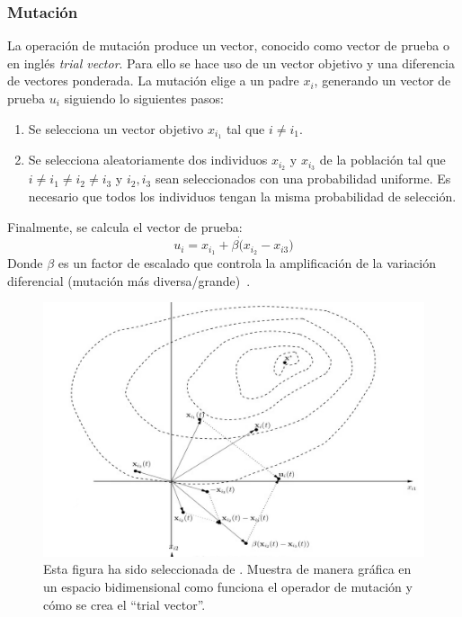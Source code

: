 \subsubsection{Mutación}
La operación de mutación produce un vector, conocido como vector de prueba o en inglés \textit{trial vector}. Para ello se hace uso de un vector objetivo y una diferencia de vectores ponderada. La mutación elige a un padre $x_{i}$, generando un vector de prueba $u_{i}$ siguiendo lo siguientes pasos:
\begin{enumerate}
    \item Se selecciona un vector objetivo $x_{i_1}$ tal que $i\neq i_1$.
    \item Se selecciona aleatoriamente dos individuos $x_{i_2}$ y $x_{i_3}$ de la población tal que $i\neq i_1\neq i_2\neq i_3$ y $i_2,i_3$ sean seleccionados con una probabilidad uniforme. Es necesario que todos los individuos tengan la misma probabilidad de selección.
\end{enumerate}
Finalmente, se calcula el vector de prueba:
\begin{equation}
    u_i = x_{i_1}+\beta\dot(x_{i_2}-x_{i3})
\end{equation}
Donde $\beta$ es un factor de escalado que controla la amplificación de la variación diferencial (mutación más diversa/grande)~\cite{storn_differential_1997}.

\begin{figure}[htp]
    \begin{center}
        \includegraphics[width=1\textwidth]{imagenes/de-mutation.png}
    \end{center}
    \caption[Mutación en DE]{Esta figura ha sido seleccionada de \cite{10.5555/1557464}. Muestra de manera gráfica en un espacio bidimensional como funciona el operador de mutación y cómo se crea el ``trial vector''.}
\end{figure}

